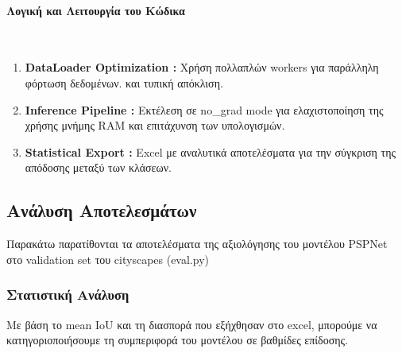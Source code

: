 \documentclass[12pt]{article}
\begin{document}
\paragraph{Λογική και Λειτουργία του Κώδικα}
\mbox{}\\
\begin{enumerate}
    \item  \textbf{DataLoader Optimization :} Χρήση πολλαπλών workers για παράλληλη φόρτωση δεδομένων.
    και τυπική απόκλιση.
    \item  \textbf{Inference Pipeline :} Εκτέλεση σε no\_grad mode για ελαχιστοποίηση της χρήσης μνήμης RAM και επιτάχυνση των υπολογισμών.                          
    \item  \textbf{Statistical Export :} Excel με αναλυτικά αποτελέσματα για την σύγκριση της απόδοσης μεταξύ των κλάσεων.
\end{enumerate}


\subsection{Ανάλυση Αποτελεσμάτων}
Παρακάτω παρατίθονται τα αποτελέσματα της αξιολόγησης του μοντέλου PSPNet στο validation set του cityscapes (eval.py)
\subsubsection{Στατιστική Ανάλυση}
Με βάση το mean IoU και τη διασπορά που εξήχθησαν στο excel, μπορούμε να κατηγοριοποιήσουμε τη συμπεριφορά του μοντέλου σε βαθμίδες επίδοσης.
\end{document}
